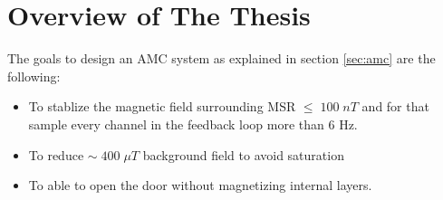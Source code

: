 





\section{Overview of The Thesis}
The goals to design an AMC system as explained in section \ref{sec:amc}  are the following:
\begin{itemize}
    \item  To stablize the magnetic field surrounding  MSR $\leq\;100\;nT$ and for that sample every channel in the feedback loop more than 6 Hz.
    \item  To reduce $\sim\;400\;\mu T$ background field to avoid saturation
    \item  To able to open the door without magnetizing internal layers.
\end{itemize}

